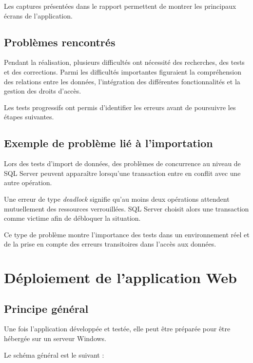 \documentclass[12pt,a4paper,oneside]{report}
\begin{document}
Les captures présentées dans le rapport permettent de montrer les principaux écrans de l'application.

\section{Problèmes rencontrés}

Pendant la réalisation, plusieurs difficultés ont nécessité des recherches, des tests et des corrections. Parmi les difficultés importantes figuraient la compréhension des relations entre les données, l'intégration des différentes fonctionnalités et la gestion des droits d'accès.

Les tests progressifs ont permis d'identifier les erreurs avant de poursuivre les étapes suivantes.

\section{Exemple de problème lié à l'importation}

Lors des tests d'import de données, des problèmes de concurrence au niveau de SQL Server peuvent apparaître lorsqu'une transaction entre en conflit avec une autre opération.

Une erreur de type \textit{deadlock} signifie qu'au moins deux opérations attendent mutuellement des ressources verrouillées. SQL Server choisit alors une transaction comme victime afin de débloquer la situation.

Ce type de problème montre l'importance des tests dans un environnement réel et de la prise en compte des erreurs transitoires dans l'accès aux données.

\chapter{Déploiement de l'application Web}

\section{Principe général}

Une fois l'application développée et testée, elle peut être préparée pour être hébergée sur un serveur Windows.

Le schéma général est le suivant :
\end{document}
